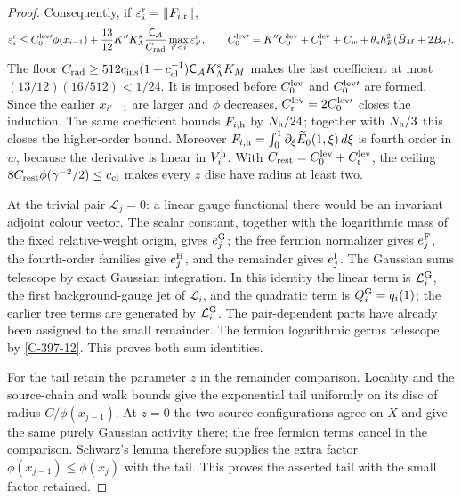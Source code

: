 \documentclass[11pt,letterpaper,reqno]{amsart}
\theoremstyle{definition}
\theoremstyle{remark}
\begin{document}
\begin{proof}
Consequently, if $\varepsilon_i^{\rm r}=\|F_{i,\rm r}\|$,
\[
 \varepsilon_i^{\rm r}\le C_0^{{\rm lev}\prime}\phi(x_{i-1})
       +\frac{13}{12}K''K_\Lambda^{\rm s}
          \frac{\mathsf C_{\mathcal A}}{C_{\rm rad}}
                              \max_{i'<i}\varepsilon_{i'}^{\rm r},
 \qquad
 C_0^{{\rm lev}\prime}=K''C_0^{\rm lev}+C_1^{\rm lev}
                      +C_w+\theta_sh_F^2(\bar B_M+2B_\sigma).
\]
The floor $C_{\rm rad}\ge512c_{\rm ins}(1+c_{\rm cl}^{-1})
\mathsf C_{\mathcal A}K_\Lambda^{\rm s}K_M$ makes the last
coefficient at most $(13/12)(16/512)<1/24$. It is imposed
before $C_0^{\rm lev}$ and $C_0^{{\rm lev}\prime}$ are formed.
Since the earlier $x_{i'-1}$ are larger and $\phi$ decreases,
$C_{\rm r}^{\rm lev}=2C_0^{{\rm lev}\prime}$ closes the
induction. The same coefficient bounds $F_{i,\rm h}$ by
$N_{\rm h}/24$; together with $N_{\rm h}/3$ this closes the
higher-order bound. Moreover
$F_{i,\rm h}=\int_0^1\partial_\xi\widetilde E_0(1,\xi)\,d\xi$
is fourth order in $w$, because the derivative is linear in
$V_i^{\rm h}$. With $C_{\rm rest}=C_0^{\rm lev}+C_{\rm r}^{\rm lev}$,
the ceiling $8C_{\rm rest}\phi(\gamma^{-2}/2)\le c_{\rm cl}$
makes every $z$ disc have radius at least two.

At the trivial pair $\mathcal L_j=0$: a linear gauge functional
there would be an invariant adjoint colour vector. The scalar
constant, together with the logarithmic mass of the fixed
relative-weight origin, gives $e_j^{\rm G}$; the free fermion normalizer
gives $e_j^{\rm F}$, the fourth-order families give $e_j^{\rm H}$,
and the remainder gives $e_j^{\rm I}$. The Gaussian sums telescope
by exact Gaussian integration. In this identity the linear term is
$\mathcal L_i^{\rm G}$, the first background-gauge jet of
$\mathcal L_i$, and the quadratic term is $Q_i^{\rm G}=q_i(1)$;
the earlier tree terms are generated by $\mathcal L_i^{\rm G}$.
The pair-dependent parts have already been assigned to the small
remainder. The fermion logarithmic germs telescope by
\cref{C-397-12}. This proves both sum identities.

For the tail retain the parameter $z$ in the remainder comparison.
Locality and the source-chain and walk bounds give the exponential
tail uniformly on its disc of radius $C/\phi(x_{j-1})$.
At $z=0$ the two source configurations agree on $X$ and give the
same purely Gaussian activity there; the free fermion terms cancel
in the comparison. Schwarz's lemma therefore supplies the extra
factor $\phi(x_{j-1})\le\phi(x_j)$ with the tail. This proves
the asserted tail with the small factor retained.
\end{proof}
\end{document}
